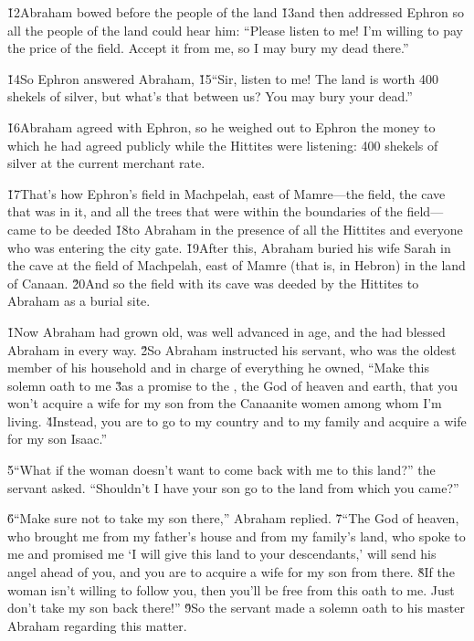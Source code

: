 \v{12}Abraham bowed before the people of the land \v{13}and then addressed Ephron so all the people of the land could hear him: ``Please listen to me! I'm willing to pay the price of the field. Accept it from me, so I may bury my dead there.''

\v{14}So Ephron answered Abraham, \v{15}``Sir, listen to me! The land is worth 400 shekels of silver, but what's that between us? You may bury your dead.''

\v{16}Abraham agreed with Ephron, so he weighed out to Ephron the money to which he had agreed publicly while the Hittites were listening: 400 shekels of silver at the current merchant rate.

\v{17}That's how Ephron's field in Machpelah, east of Mamre---the field, the cave that was in it, and all the trees that were within the boundaries of the field---came to be deeded \v{18}to Abraham in the presence of all the Hittites and everyone who was entering the city gate. \v{19}After this, Abraham buried his wife Sarah in the cave at the field of Machpelah, east of Mamre (that is, in Hebron) in the land of Canaan. \v{20}And so the field with its cave was deeded by the Hittites to Abraham as a burial site.

\v{1}Now Abraham had grown old, was well advanced in age, and the  had blessed Abraham in every way. \v{2}So Abraham instructed his servant, who was the oldest member of his household and in charge of everything he owned, ``Make this solemn oath to me \v{3}as a promise to the , the God of heaven and earth, that you won't acquire a wife for my son from the Canaanite women among whom I'm living. \v{4}Instead, you are to go to my country and to my family and acquire a wife for my son Isaac.''

\v{5}``What if the woman doesn't want to come back with me to this land?'' the servant asked. ``Shouldn't I have your son go to the land from which you came?''

\v{6}``Make sure not to take my son there,'' Abraham replied. \v{7}``The  God of heaven, who brought me from my father's house and from my family's land, who spoke to me and promised me `I will give this land to your descendants,' will send his angel ahead of you, and you are to acquire a wife for my son from there. \v{8}If the woman isn't willing to follow you, then you'll be free from this oath to me. Just don't take my son back there!'' \v{9}So the servant made a solemn oath to his master Abraham regarding this matter.

